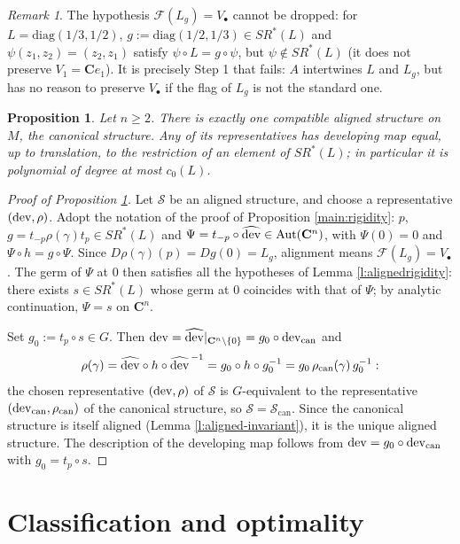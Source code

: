 \documentclass[english,11pt]{amsart}
\newtheorem{proposition}[theorem]{Proposition}
\theoremstyle{definition}
\theoremstyle{remark}
\newtheorem{remark}[theorem]{Remark}
\numberwithin{equation}{section}
\newcommand{\C}{\mathbf{C}}
\newcommand{\FF}{\mathcal{F}}
\newcommand{\Aut}{\mathop{\rm Aut}}
\newcommand{\dev}{\mathop{\rm dev}\nolimits}
\newcommand{\Sc}{\mathcal{S}}
\begin{document}
\begin{remark}\label{r:hypothesisneeded}
The hypothesis $\FF(L_g)=V_\bullet$ cannot be dropped: for $L=\mathrm{diag}(1/3,1/2)$, $g:=\mathrm{diag}(1/2,1/3)\in SR^*(L)$ and $\psi(z_1,z_2)=(z_2,z_1)$ satisfy $\psi\circ L=g\circ\psi$, but $\psi\notin SR^*(L)$ (it does not preserve $V_1=\C e_1$). It is precisely Step 1 that fails: $A$ intertwines $L$ and $L_g$, but has no reason to preserve $V_\bullet$ if the flag of $L_g$ is not the standard one.
\end{remark}

\begin{proposition}\label{main:aligned}
Let $n\geq 2$. There is exactly one compatible aligned structure on $M$, the canonical structure. Any of its representatives has developing map equal, up to translation, to the restriction of an element of $SR^*(L)$; in particular it is polynomial of degree at most $c_0(L)$.
\end{proposition}

\begin{proof}[Proof of Proposition \ref{main:aligned}]
Let $\Sc$ be an aligned structure, and choose a representative $(\dev,\rho)$. Adopt the notation of the proof of Proposition \ref{main:rigidity}: $p$, $g=t_{-p}\rho(\gamma)t_p\in SR^*(L)$ and $\Psi=t_{-p}\circ\widehat{\dev}\in\Aut(\C^n)$, with $\Psi(0)=0$ and $\Psi\circ h=g\circ\Psi$. Since $D\rho(\gamma)(p)=Dg(0)=L_g$, alignment means $\FF(L_g)=V_\bullet$. The germ of $\Psi$ at $0$ then satisfies all the hypotheses of Lemma \ref{l:alignedrigidity}: there exists $s\in SR^*(L)$ whose germ at $0$ coincides with that of $\Psi$; by analytic continuation, $\Psi=s$ on $\C^n$.

Set $g_0:=t_p\circ s\in G$. Then $\dev=\widehat{\dev}|_{\C^n\setminus\{0\}}=g_0\circ\dev_{\mathrm{can}}$ and
\[
\rho(\gamma)=\widehat{\dev}\circ h\circ\widehat{\dev}^{\,-1}=g_0\circ h\circ g_0^{-1}=g_0\,\rho_{\mathrm{can}}(\gamma)\,g_0^{-1} :
\]
the chosen representative $(\dev,\rho)$ of $\Sc$ is $G$-equivalent to the representative $(\dev_{\mathrm{can}},\rho_{\mathrm{can}})$ of the canonical structure, so $\Sc=\Sc_{\mathrm{can}}$. Since the canonical structure is itself aligned (Lemma \ref{l:aligned-invariant}), it is the unique aligned structure. The description of the developing map follows from $\dev=g_0\circ\dev_{\mathrm{can}}$ with $g_0=t_p\circ s$.
\end{proof}

\section{Classification and optimality}\label{s:classification}
\end{document}
